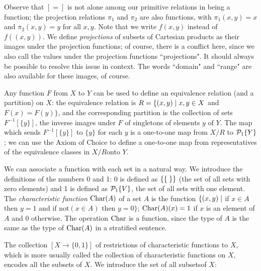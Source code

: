 Observe that $[=]$ is not alone among our primitive relations
in being a function; the projection relations $\pi_1$ and
$\pi_2$ are also functions, with $\pi_1(x,y) = x$ and $\pi_2(x,y) = y$ for all
$x,y$.  Note that we write $f(x,y)$ instead of $f((x,y))$.  We define
{\itshape projections} of subsets of
Cartesian products as their images
under the projection functions; of course, there is a conflict here,
since we also call the values under the projection functions
``projections".  It should always be possible to resolve
this issue in context.  The words ``domain" and ``range" are also
available for these images, of course.

Any function $F$ from $X$ to $Y$ can be used to define an
equivalence relation (and a
partition) on $X$: the equivalence 
relation is $R  = \{(x,y) \mid x,y \in X$ and $F(x) = F(y)\}$, and
the corresponding partition is the collection of sets
$F^{-1}[\{y\}]$, the inverse images under $F$ of singletons of
elements $y$ of $Y$.  The map which sends $F^{-1}[\{y\}]$ to
$\{y\}$ for each $y$ is a one-to-one map from $X/R$ to
${\cal P}_1\{Y\}$; we can use the Axiom of Choice to
define a one-to-one map 
from representatives of the equivalence classes in $X/R$\linebreak onto $Y$.

We can associate a function with each set in a natural way.
We introduce the definitions of the numbers 0 and 1: 0 is defined as
$\{\mbox{$\{\;\}$}\}$ (the set of all sets with zero elements) and 1 is defined as ${\cal
P}_1\{V\}$, 
the set of all sets with one element.  The {\itshape characteristic
function\/}
$\mathop{\mathrm{Char}}(A)$ of a set $A$ is the function $\{(x,y) \mid$ if $x \in A$ then $y = 1$
and if not$(x \in A)$ then $y = 0\}$; $\mathop{\mathrm{Char}}(A)(x) = 1$ if $x$ is an element of
$A$ and 0 otherwise.  The operation $\mathop{\mathrm{Char}}$ is a function,
since the type of $A$ is the same as the type of
$\mathop{\mathrm{Char}}(A)$ in a stratified sentence.

The collection $[X \rightarrow  \{0,1\}]$ of restrictions of characteristic
functions to $X$, which is more usually called the collection of
characteristic functions on $X$, encodes all the subsets of $X$.
We introduce the set of all subsets\linebreak of $X$:

